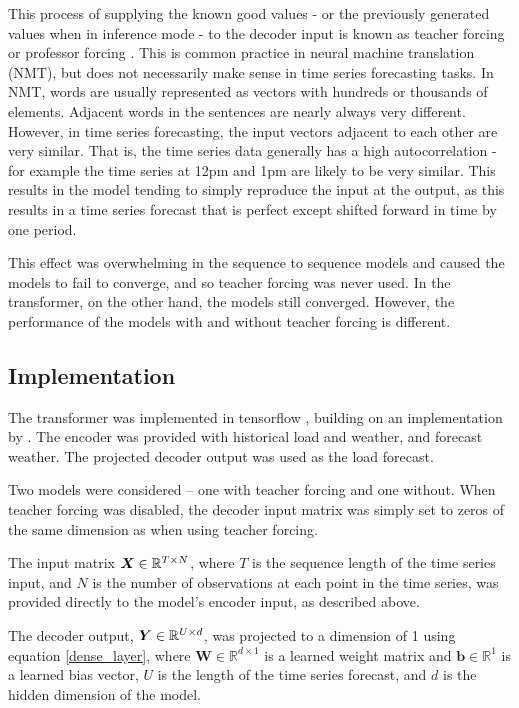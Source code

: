 This process of supplying the known good values - or the previously generated values when in inference mode - to the decoder input is known as teacher forcing or professor forcing \cite{lamb2016professor}.
This is common practice in neural machine translation (NMT), but does not necessarily make sense in time series forecasting tasks.
In NMT, words are usually represented as vectors with hundreds or thousands of elements.
Adjacent words in the sentences are nearly always very different.
However, in time series forecasting, the input vectors adjacent to each other are very similar.
That is, the time series data generally has a high autocorrelation - for example the time series at 12pm and 1pm are likely to be very similar.
This results in the model tending to simply reproduce the input at the output, as this results in a time series forecast that is perfect except shifted forward in time by one period.

This effect was overwhelming in the sequence to sequence models and caused the models to fail to converge, and so teacher forcing was never used.
In the transformer, on the other hand, the models still converged.
However, the performance of the models with and without teacher forcing is different.

\subsection{Implementation}
The transformer was implemented in tensorflow \cite{tensorflow2015-whitepaper}, building on an implementation by \citet{Park2017}.
The encoder was provided with historical load and weather, and forecast weather.
The projected decoder output was used as the load forecast.

Two models were considered -- one with teacher forcing and one without.
When teacher forcing was disabled, the decoder input matrix was simply set to zeros of the same dimension as when using teacher forcing.

The input matrix ${\bm{X}} \in \mathbb{R}^{T \times N}$, where $T$ is the sequence length of the time series input, and $N$ is the number of observations at each point in the time series, was provided directly to the model's encoder input, as described above.

The decoder output, ${\bm{Y}} \in \mathbb{R}^{U \times d}$, was projected to a dimension of 1 using equation \ref{dense_layer}, where $\boldsymbol{W} \in \mathbb{R}^{d \times 1}$ is a learned weight matrix and $\boldsymbol{b} \in \mathbb{R}^{1}$ is a learned bias vector, $U$ is the length of the time series forecast, and $d$ is the hidden dimension of the model.

